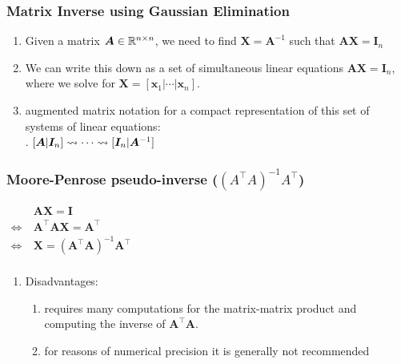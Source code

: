 \subsubsection{Matrix Inverse using Gaussian Elimination}

\begin{enumerate}
    \item Given a matrix $\bm{A} \in \mathbb{R}^{n\times n}$, we need to find $\bm{X} = \bm{A}^{-1}$ such that $\bm{A}\bm{X} = \bm{I}_n$
    \hfill \cite{mfml/book/mml/Deisenroth-Faisal-Ong}
    
    \item We can write this down as a set of simultaneous linear equations $\bm{A}\bm{X} = \bm{I}_n$, where we solve for $\bm{X} = [\bm{x}_1| \cdots |\bm{x}_n]$. 
    \hfill \cite{mfml/book/mml/Deisenroth-Faisal-Ong}

    \item augmented matrix notation for a compact representation of this set of systems of linear equations:
    \hfill \cite{mfml/book/mml/Deisenroth-Faisal-Ong}
    \\
    .\hfill
    $
        [\bm{A}|\bm{I}_n] 
        \mathrel{\leadsto} \cdots \mathrel{\leadsto} 
        [\bm{I}_n|\bm{A}^{-1}]
    $
    \hfill \cite{mfml/book/mml/Deisenroth-Faisal-Ong}

    
\end{enumerate}




\subsubsection{Moore-Penrose pseudo-inverse ($({A}^\top {A})^{-1} {A}^\top$)}

$
    \begin{aligned}
                         & \bm{A}\bm{X} = \bm{I} \\
        \Leftrightarrow\ & \bm{A}^\top \bm{A}\bm{X} = \bm{A}^\top \\
        \Leftrightarrow\ & \bm{X} = (\bm{A}^\top \bm{A})^{-1} \bm{A}^\top \\
    \end{aligned}
$
\hfill \cite{mfml/book/mml/Deisenroth-Faisal-Ong}


\vspace{0.2cm}

\begin{enumerate}
    \item Disadvantages:
    \begin{enumerate}
        \item requires many computations for the matrix-matrix product and computing the inverse of $\bm{A}^\top \bm{A}$. 
        \hfill \cite{mfml/book/mml/Deisenroth-Faisal-Ong}

        \item for reasons of numerical precision it is generally not recommended
        \hfill \cite{mfml/book/mml/Deisenroth-Faisal-Ong}
    \end{enumerate}
\end{enumerate}





